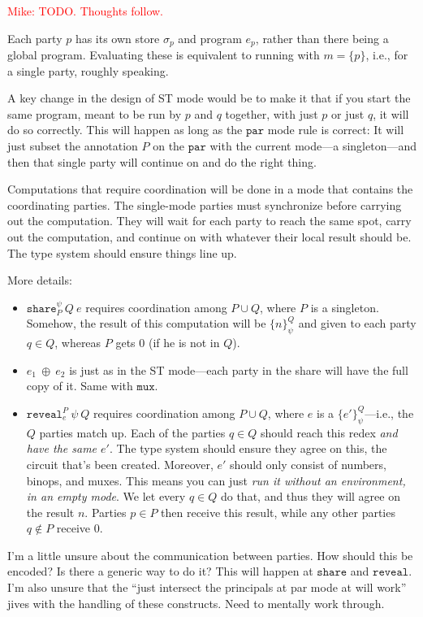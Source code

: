 \documentclass[10pt]{article}
\newcommand{\kw}[1]{\ensuremath{\mathtt{#1}}}
\newcommand{\ebinop}[2]{\ensuremath{{#1}~\oplus~{#2}}}
\newcommand{\ereveal}[4]{\ensuremath{\kw{reveal}^{#1}_{#4}~{#2}~{#3}}}
\newcommand{\eshare}[4]{\ensuremath{\kw{share}^{#2}_{#1}~{#3}~{#4}}}
\newcommand{\vshare}[3]{\ensuremath{\{{#3}\}^{#1}_{#2}}}
\newcommand{\env}{\ensuremath{\sigma}}
\newcommand{\mwh}[1]{\textcolor{red}{Mike: #1}}
\begin{document}
\mwh{TODO. Thoughts follow.}

Each party $p$ has its own store $\env_p$ and program $e_p$, rather
than there being a global program. Evaluating these is equivalent to
running with $m = \{ p \}$, i.e., for a single party, roughly
speaking.

A key change in the design of ST mode would be to make it that if you
start the same program, meant to be run by $p$ and $q$ together, with
just $p$ or just $q$, it will do so correctly. This will happen as
long as the $\kw{par}$ mode rule is correct: It will just subset the
annotation $P$ on the $\kw{par}$ with the current mode---a
singleton---and then that single party will continue on and do the
right thing. 

Computations that require coordination will be done in a mode that
contains the coordinating parties. The single-mode parties must
synchronize before carrying out the computation. They will wait for
each party to reach the same spot, carry out the computation, and
continue on with whatever their local result should be. The type
system should ensure things line up.

More details:
\begin{itemize}
\item $\eshare{P}{\psi}{Q}{e}$ requires coordination among $P \cup Q$,
  where $P$ is a singleton. Somehow, the result of this computation
  will be $\vshare{Q}{\psi}{n}$ and given to each party $q \in Q$,
whereas $P$ gets $0$ (if he is not in $Q$).
\item $\ebinop{e_1}{e_2}$ is just as in the ST mode---each party in
  the share will have the full copy of it. Same with $\kw{mux}$.
\item $\ereveal{P}{\psi}{Q}{e}$ requires coordination among $P \cup
  Q$, where $e$ is a $\vshare{Q}{\psi}{e'}$---i.e., the $Q$ parties
match up. Each of the parties $q \in Q$ should reach this redex
\emph{and have the same $e'$}. The type system should ensure they
agree on this, the circuit that's been created. Moreover, $e'$ should
only consist of numbers, binops, and muxes. This means you can just
\emph{run it without an environment, in an empty mode}. We let every
$q \in Q$ do that, and thus they will agree on the result $n$. Parties
$p \in P$ then receive this result, while any other parties $q \not\in
P$ receive $0$.
\end{itemize}

I'm a little unsure about the communication between parties. How
should this be encoded? Is there a generic way to do it? This will
happen at $\kw{share}$ and $\kw{reveal}$. I'm also unsure that the
``just intersect the principals at par mode at will work'' jives with
the handling of these constructs. Need to mentally work through.
\end{document}
